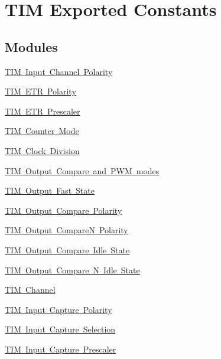 \hypertarget{group___t_i_m___exported___constants}{}\section{T\+IM Exported Constants}
\label{group___t_i_m___exported___constants}
\subsection*{Modules}
\begin{DoxyCompactItemize}
\item 
\mbox{\hyperlink{group___t_i_m___input___channel___polarity}{T\+I\+M Input Channel Polarity}}
\item 
\mbox{\hyperlink{group___t_i_m___e_t_r___polarity}{T\+I\+M E\+T\+R Polarity}}
\item 
\mbox{\hyperlink{group___t_i_m___e_t_r___prescaler}{T\+I\+M E\+T\+R Prescaler}}
\item 
\mbox{\hyperlink{group___t_i_m___counter___mode}{T\+I\+M Counter Mode}}
\item 
\mbox{\hyperlink{group___t_i_m___clock_division}{T\+I\+M Clock Division}}
\item 
\mbox{\hyperlink{group___t_i_m___output___compare__and___p_w_m__modes}{T\+I\+M Output Compare and P\+W\+M modes}}
\item 
\mbox{\hyperlink{group___t_i_m___output___fast___state}{T\+I\+M Output Fast State}}
\item 
\mbox{\hyperlink{group___t_i_m___output___compare___polarity}{T\+I\+M Output Compare Polarity}}
\item 
\mbox{\hyperlink{group___t_i_m___output___compare___n___polarity}{T\+I\+M Output Compare\+N Polarity}}
\item 
\mbox{\hyperlink{group___t_i_m___output___compare___idle___state}{T\+I\+M Output Compare Idle State}}
\item 
\mbox{\hyperlink{group___t_i_m___output___compare___n___idle___state}{T\+I\+M Output Compare N Idle State}}
\item 
\mbox{\hyperlink{group___t_i_m___channel}{T\+I\+M Channel}}
\item 
\mbox{\hyperlink{group___t_i_m___input___capture___polarity}{T\+I\+M Input Capture Polarity}}
\item 
\mbox{\hyperlink{group___t_i_m___input___capture___selection}{T\+I\+M Input Capture Selection}}
\item 
\mbox{\hyperlink{group___t_i_m___input___capture___prescaler}{T\+I\+M Input Capture Prescaler}}

\end{DoxyCompactItemize}
